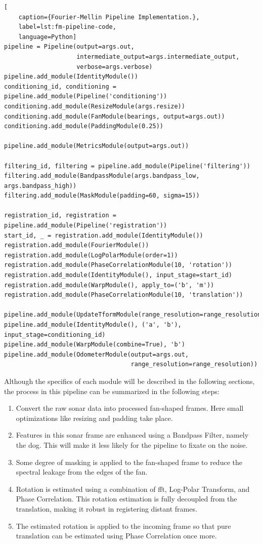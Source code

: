 \begin{lstlisting}[
    caption={Fourier-Mellin Pipeline Implementation.},
    label=lst:fm-pipeline-code,
    language=Python]
pipeline = Pipeline(output=args.out, 
                    intermediate_output=args.intermediate_output, 
                    verbose=args.verbose)
pipeline.add_module(IdentityModule())
conditioning_id, conditioning = pipeline.add_module(Pipeline('conditioning'))
conditioning.add_module(ResizeModule(args.resize))
conditioning.add_module(FanModule(bearings, output=args.out))
conditioning.add_module(PaddingModule(0.25))

pipeline.add_module(MetricsModule(output=args.out))

filtering_id, filtering = pipeline.add_module(Pipeline('filtering'))
filtering.add_module(BandpassModule(args.bandpass_low, args.bandpass_high))
filtering.add_module(MaskModule(padding=60, sigma=15))

registration_id, registration = pipeline.add_module(Pipeline('registration'))
start_id, _ = registration.add_module(IdentityModule())
registration.add_module(FourierModule())
registration.add_module(LogPolarModule(order=1))
registration.add_module(PhaseCorrelationModule(10, 'rotation'))
registration.add_module(IdentityModule(), input_stage=start_id)
registration.add_module(WarpModule(), apply_to=('b', 'm'))
registration.add_module(PhaseCorrelationModule(10, 'translation'))

pipeline.add_module(UpdateTformModule(range_resolution=range_resolution))
pipeline.add_module(IdentityModule(), ('a', 'b'), input_stage=conditioning_id)
pipeline.add_module(WarpModule(combine=True), 'b')
pipeline.add_module(OdometerModule(output=args.out, 
                                   range_resolution=range_resolution))
\end{lstlisting}

Although the specifics of each module will be described in the following sections, the process in this pipeline can be summarized in the following steps:
\begin{enumerate}
    \item Convert the raw sonar data into processed fan-shaped frames. Here small optimizations like resizing and padding take place.
    \item Features in this sonar frame are enhanced using a Bandpass Filter, namely the \acrfull{dog}. This will make it less likely for the pipeline to fixate on the noise. 
    \item Some degree of masking is applied to the fan-shaped frame to reduce the spectral leakage from the edges of the fan.
    \item Rotation is estimated using a combination of \acrshort{fft}, Log-Polar Transform, and Phase Correlation. This rotation estimation is fully decoupled from the translation, making it robust in registering distant frames.
    \item The estimated rotation is applied to the incoming frame so that pure translation can be estimated using Phase Correlation once more.
\end{enumerate}

